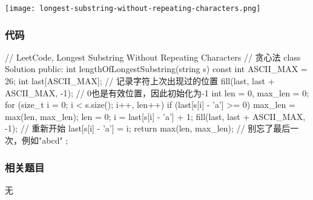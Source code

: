 \begin{center}
\texttt{[image: longest-substring-without-repeating-characters.png]}\\
\label{fig:longest-substring-without-repeating-characters}
\end{center}


\subsubsection{代码}
\begin{Code}
// LeetCode, Longest Substring Without Repeating Characters
// 贪心法
class Solution {
public:
    int lengthOfLongestSubstring(string s) {
        const int ASCII_MAX = 26;
        int last[ASCII_MAX]; // 记录字符上次出现过的位置
        fill(last, last + ASCII_MAX, -1); // 0也是有效位置，因此初始化为-1
        int len = 0, max_len = 0;
        for (size_t i = 0; i < s.size(); i++, len++) {
            if (last[s[i] - 'a'] >= 0) {
                max_len = max(len, max_len);
                len = 0;
                i = last[s[i] - 'a'] + 1;
                fill(last, last + ASCII_MAX, -1);   // 重新开始
            }
            last[s[i] - 'a'] = i;
        }
        return max(len, max_len);  // 别忘了最后一次，例如"abcd"
    }
};
\end{Code}


\subsubsection{相关题目}
\begindot
\item 无
\myenddot

